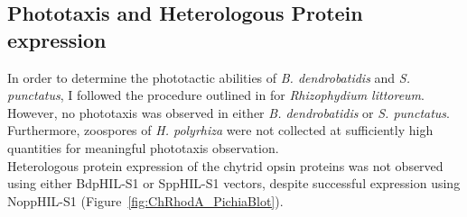\subsection*{Phototaxis and Heterologous Protein expression}
In order to determine the phototactic abilities of \textit{B. dendrobatidis} and \textit{S. punctatus}, I followed the procedure outlined in \cite{Muehlstein1987} for \textit{Rhizophydium littoreum}. However, no phototaxis was observed in either \textit{B. dendrobatidis} or \textit{S. punctatus}. Furthermore, zoospores of \textit{H. polyrhiza} were not collected at sufficiently high quantities for meaningful phototaxis observation.\\
\indent Heterologous protein expression of the chytrid opsin proteins was not observed using either BdpHIL-S1 or SppHIL-S1 vectors, despite successful expression using NoppHIL-S1 (Figure~\ref{fig:ChRhodA_PichiaBlot}).\\ 

